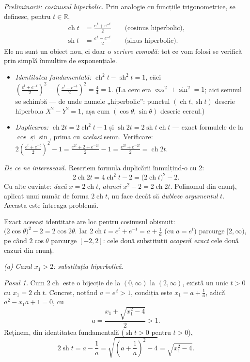 \medskip
\emph{Preliminarii: cosinusul hiperbolic.} Prin analogie cu funcțiile trigonometrice, se definesc, pentru $t\in\mathbb{R}$,
\[ \begin{aligned} \operatorname{ch}t&=\frac{e^{\,t}+e^{-t}}{2}\qquad\text{(cosinus hiperbolic)},\\ \operatorname{sh}t&=\frac{e^{\,t}-e^{-t}}{2}\qquad\text{(sinus hiperbolic)} . \end{aligned} \]
Ele nu sunt un obiect nou, ci doar o \emph{scriere comodă}: tot ce vom folosi se verifică prin simplă înmulțire de exponențiale.
\begin{itemize}
  \item \emph{Identitatea fundamentală:} $\operatorname{ch}^{2}t-\operatorname{sh}^{2}t=1$, căci $\left(\frac{e^{t}+e^{-t}}{2}\right)^{2}-\left(\frac{e^{t}-e^{-t}}{2}\right)^{2}=\frac{4}{4}=1$. (La cerc era $\cos^{2}+\sin^{2}=1$; aici semnul se schimbă --- de unde numele „hiperbolic'': punctul $(\operatorname{ch}t,\operatorname{sh}t)$ descrie hiperbola $X^{2}-Y^{2}=1$, așa cum $(\cos\theta,\sin\theta)$ descrie cercul.)
  \item \emph{Duplicarea:} $\operatorname{ch}2t=2\operatorname{ch}^{2}t-1$ și $\operatorname{sh}2t=2\operatorname{sh}t\operatorname{ch}t$ --- exact formulele de la $\cos$ și $\sin$, prima cu \emph{același} semn. Verificare: $2\left(\frac{e^{t}+e^{-t}}{2}\right)^{2}-1=\frac{e^{2t}+2+e^{-2t}}{2}-1=\frac{e^{2t}+e^{-2t}}{2}=\operatorname{ch}2t$. \checkmark
\end{itemize}
\emph{De ce ne interesează.} Rescriem formula duplicării înmulțind-o cu $2$:
\[ 2\operatorname{ch}2t=4\operatorname{ch}^{2}t-2=\bigl(2\operatorname{ch}t\bigr)^{2}-2 . \]
Cu alte cuvinte: \emph{dacă} $x=2\operatorname{ch}t$, \emph{atunci} $x^{2}-2=2\operatorname{ch}2t$. Polinomul din enunț, aplicat unui număr de forma $2\operatorname{ch}t$, nu face decât să \emph{dubleze argumentul} $t$. Aceasta este întreaga problemă.

Exact aceeași identitate are loc pentru cosinusul obișnuit: $\bigl(2\cos\theta\bigr)^{2}-2=2\cos2\theta$. Iar $2\operatorname{ch}t=e^{t}+e^{-t}=a+\frac1a$ (cu $a=e^{t}$) parcurge $[2,\infty)$, pe când $2\cos\theta$ parcurge $[-2,2]$: cele două substituții \emph{acoperă exact} cele două cazuri din enunț.

\medskip
\emph{(a) Cazul $x_{1}>2$: substituția hiperbolică.}

\emph{Pasul 1.} Cum $2\operatorname{ch}$ este o bijecție de la $(0,\infty)$ la $(2,\infty)$, există un unic $t>0$ cu $x_{1}=2\operatorname{ch}t$. Concret, notând $a=e^{\,t}>1$, condiția este $x_{1}=a+\frac1a$, adică $a^{2}-x_{1}a+1=0$, cu
\[ a=\frac{x_{1}+\sqrt{x_{1}^{2}-4}}{2}>1 . \]
Reținem, din identitatea fundamentală ($\operatorname{sh}t>0$ pentru $t>0$),
\[ 2\operatorname{sh}t=a-\frac1a=\sqrt{\left(a+\frac1a\right)^{2}-4}=\sqrt{x_{1}^{2}-4} . \tag{1} \]

